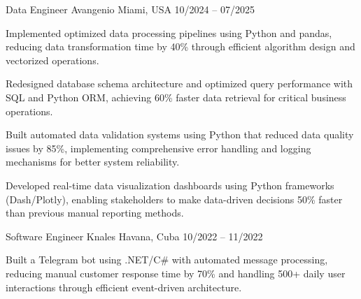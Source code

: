 \documentclass[]{awesome-cv}
\begin{document}
\begin{cventries}
	\cventry
	{Data Engineer}
	{Avangenio}
	{Miami, USA}
	{10/2024 – 07/2025}
	{\begin{cvitems}
			\vspace{0.5mm}
			\item {Implemented optimized data processing pipelines using Python and pandas, reducing data transformation time by 40\% through efficient algorithm design and vectorized operations.}
			\item {Redesigned database schema architecture and optimized query performance with SQL and Python ORM, achieving 60\% faster data retrieval for critical business operations.}
			\item {Built automated data validation systems using Python that reduced data quality issues by 85\%, implementing comprehensive error handling and logging mechanisms for better system reliability.}
			\item {Developed real-time data visualization dashboards using Python frameworks (Dash/Plotly), enabling stakeholders to make data-driven decisions 50\% faster than previous manual reporting methods.}
		\end{cvitems}}

	\cventry
	{Software Engineer}
	{Knales}
	{Havana, Cuba}
	{10/2022 – 11/2022}
	{\begin{cvitems}
			\vspace{0.5mm}
			\item {Built a Telegram bot using .NET/C\# with automated message processing, reducing manual customer response time by 70\% and handling 500+ daily user interactions through efficient event-driven architecture.}
		\end{cvitems}}
\end{cventries}
\end{document}
